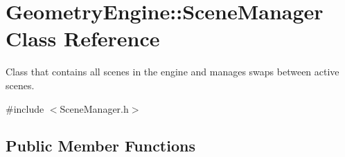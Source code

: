\hypertarget{class_geometry_engine_1_1_scene_manager}{}\section{Geometry\+Engine\+::Scene\+Manager Class Reference}
\label{class_geometry_engine_1_1_scene_manager}


Class that contains all scenes in the engine and manages swaps between active scenes.  




{\ttfamily \#include $<$Scene\+Manager.\+h$>$}

\subsection*{Public Member Functions}
